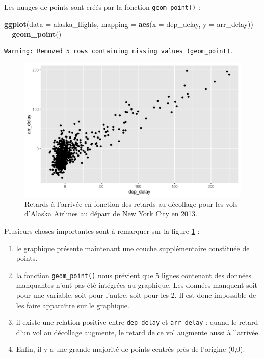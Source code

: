 \documentclass[
  a4paper,
]{article}
\newenvironment{Shaded}{\begin{snugshade}}{\end{snugshade}}
\newcommand{\DataTypeTok}[1]{\textcolor[rgb]{0.00,0.34,0.68}{#1}}
\newcommand{\KeywordTok}[1]{\textcolor[rgb]{0.12,0.11,0.11}{\textbf{#1}}}
\newcommand{\NormalTok}[1]{\textcolor[rgb]{0.12,0.11,0.11}{#1}}
\newcommand{\OperatorTok}[1]{\textcolor[rgb]{0.12,0.11,0.11}{#1}}
\newcommand{\StringTok}[1]{\textcolor[rgb]{0.75,0.01,0.01}{#1}}
\providecommand{\tightlist}{%
  \setlength{\itemsep}{0pt}\setlength{\parskip}{0pt}}
\begin{document}
Les nuages de points sont créés par la fonction \texttt{geom\_point()} :

\begin{Shaded}
\begin{Highlighting}[]
\KeywordTok{ggplot}\NormalTok{(}\DataTypeTok{data =}\NormalTok{ alaska_flights, }\DataTypeTok{mapping =} \KeywordTok{aes}\NormalTok{(}\DataTypeTok{x =}\NormalTok{ dep_delay, }\DataTypeTok{y =}\NormalTok{ arr_delay)) }\OperatorTok{+}\StringTok{ }
\StringTok{  }\KeywordTok{geom_point}\NormalTok{()}
\end{Highlighting}
\end{Shaded}

\begin{verbatim}
Warning: Removed 5 rows containing missing values (geom_point).
\end{verbatim}

\begin{figure}[!htpb]

{\centering \includegraphics[width=0.9\linewidth]{figure/points-1} 

}

\caption{Retards à l'arrivée en fonction des retards au décollage pour les vols d'Alaska Airlines au départ de New York City en 2013.}\label{fig:points}
\end{figure}

Plusieurs choses importantes sont à remarquer sur la figure \ref{fig:points} :

\begin{enumerate}
\def\labelenumi{\arabic{enumi}.}
\tightlist
\item
  le graphique présente maintenant une couche supplémentaire constituée de points.
\item
  la fonction \texttt{geom\_point()} nous prévient que 5 lignes contenant des données manquantes n'ont pas été intégrées au graphique. Les données manquent soit pour une variable, soit pour l'autre, soit pour les 2. Il est donc impossible de les faire apparaître sur le graphique.
\item
  il existe une relation positive entre \texttt{dep\_delay} et \texttt{arr\_delay} : quand le retard d'un vol au décollage augmente, le retard de ce vol augmente aussi à l'arrivée.
\item
  Enfin, il y a une grande majorité de points centrés près de l'origine (0,0).
\end{enumerate}
\end{document}

